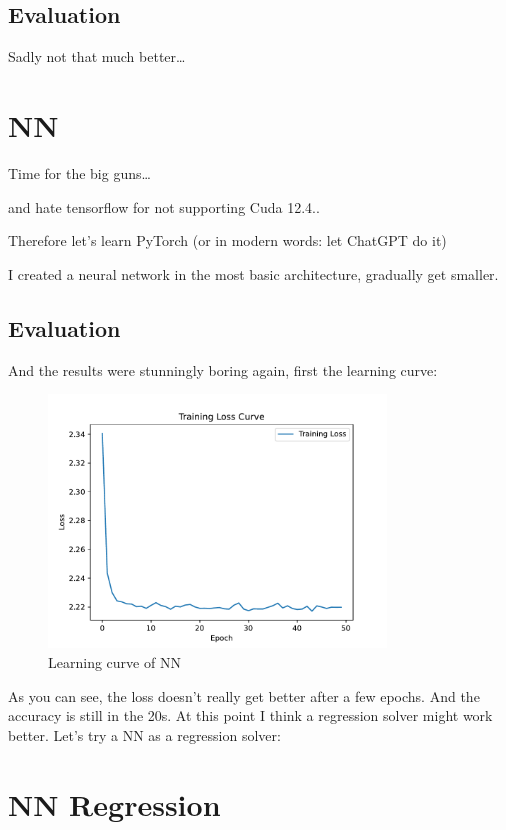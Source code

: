 \documentclass{article}
\begin{document}
\subsection{Evaluation}
Sadly not that much better\ldots
\section{NN}
Time for the big guns\ldots

and hate tensorflow for not supporting Cuda 12.4..

Therefore let's learn PyTorch (or in modern words: let ChatGPT do it)



I created a neural network in the most basic architecture, gradually get smaller. 
\subsection{Evaluation}
And the results were stunningly boring again, first the learning curve:

\begin{figure}[H]
    \centering    
    \includegraphics[width=0.8\textwidth]{../Models/NN/nn_learning_curve_epoch_50.pdf}
    \caption{Learning curve of NN}\label{fig:learning_curve_nn}
\end{figure}

As you can see, the loss doesn't really get better after a few epochs.
And the accuracy is still in the 20s.
At this point I think a regression solver might work better. Let's try a NN as a regression solver:

\section{NN Regression}
\end{document}
